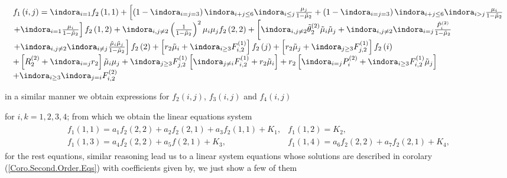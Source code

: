 \begin{eqnarray}\label{Eq.Sdo.Orden.Exh.uno}
\begin{array}{l}
f_{1}\left(i,j\right)=\indora_{i=1}f_{2}\left(1,1\right)
+\left[\left(1-\indora_{i=j=3}\right)\indora_{i+j\leq6}\indora_{i\leq j}\frac{\mu_{j}}{1-\tilde{\mu}_{2}}
+\left(1-\indora_{i=j=3}\right)\indora_{i+j\leq6}\indora_{i>j}\frac{\mu_{i}}{1-\tilde{\mu}_{2}}\right.\\
\left.+\indora_{i=1}\frac{\mu_{i}}{1-\tilde{\mu}_{2}}\right]f_{2}\left(1,2\right)+\indora_{i,j\neq2}\left(\frac{1}{1-\tilde{\mu}_{2}}\right)^{2}\mu_{i}\mu_{j}f_{2}\left(2,2\right)
+\left[\indora_{i,j\neq2}\tilde{\theta}_{2}^{(2)}\tilde{\mu}_{i}\tilde{\mu}_{j}
+\indora_{i,j\neq2}\indora_{i=j}\frac{\tilde{P}_{i}^{(2)}}{1-\tilde{\mu}_{2}}\right.\\
\left.+\indora_{i,j\neq2}\indora_{i\neq j}\frac{\tilde{\mu}_{i}\tilde{\mu}_{j}}{1-\tilde{\mu}_{2}}\right]f_{2}\left(2\right)
+\left[r_{2}\tilde{\mu}_{i}
+\indora_{i\geq3}F_{i,2}^{(1)}\right]f_{2}\left(j\right)
+\left[r_{2}\tilde{\mu}_{j}
+\indora_{j\geq3}F_{j,2}^{(1)}\right]f_{2}\left(i\right)\\
+\left[R_{2}^{(2)}
+\indora_{i=j}r_{2}\right]\tilde{\mu}_{i}\mu_{j}+\indora_{j\geq3}F_{j,2}^{(1)}\left[\indora_{j\neq i}F_{i,2}^{(1)}
+r_{2}\tilde{\mu}_{i}\right]
+r_{2}\left[\indora_{i=j}P_{i}^{(2)}
+\indora_{i\geq3}F_{i,2}^{(1)}\tilde{\mu}_{j}\right]\\
+\indora_{i\geq3}\indora_{j=i}F_{i,2}^{(2)}
\end{array}
\end{eqnarray}

in a similar manner we obtain expressions for $f_{2}\left(i,j\right)$, $f_{3}\left(i,j\right)$ and $f_{4}\left(i,j\right)$

for $i,k=1,2,3,4$; from which we obtain the linear equations system
\begin{eqnarray}\label{System.Second.Order.Moments.uno}
\begin{array}{ll}
f_{1}\left(1,1\right)=a_{1}f_{2}\left(2,2\right)
+a_{2}f_{2}\left(2,1\right)
+a_{3}f_{2}\left(1,1\right)
+K_{1},&
f_{1}\left(1,2\right)=K_{2},\\
f_{1}\left(1,3\right)=a_{4}f_{2}\left(2,2\right)+a_{5}f\left(2,1\right)+K_{3},&
f_{1}\left(1,4\right)=a_{6}f_{2}\left(2,2\right)+a_{7}f_{2}\left(2,1\right)+K_{4},\end{array}
\end{eqnarray}
for the rest equations, similar reasoning lead us to a linear system equations whose solutions are described in corolary (\ref{Coro.Second.Order.Eqs}) with coefficients given by, we just show a few of them


